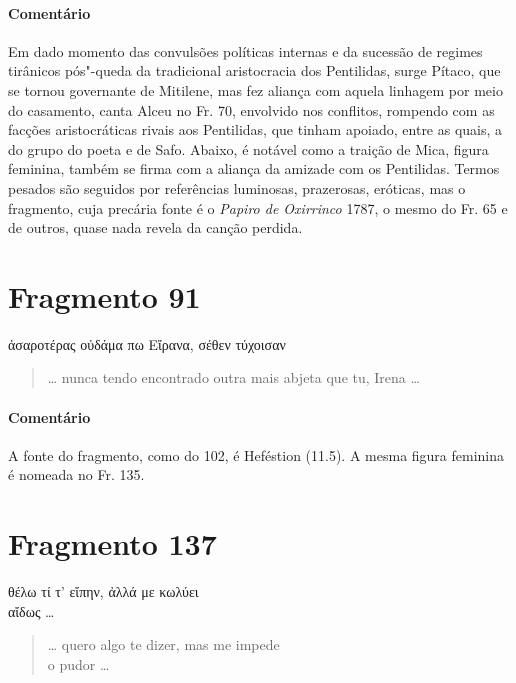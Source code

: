 {{\paragraph{Comentário} Em dado momento das convulsões políticas internas e da sucessão de regimes
tirânicos pós"-queda da tradicional aristocracia dos Pentilidas, surge Pítaco, que se tornou governante de
Mitilene, mas fez aliança com aquela linhagem por meio do casamento,
canta Alceu no Fr. 70, envolvido nos conflitos,
rompendo com as facções aristocráticas rivais aos Pentilidas, que tinham apoiado, entre as quais, a
do grupo do poeta e de Safo. Abaixo, é notável como a traição de 
Mica, figura feminina, também se firma com a aliança da amizade com os Pentilidas. Termos
pesados são seguidos por referências luminosas, prazerosas, eróticas, mas o
fragmento, cuja precária fonte é o \textit{Papiro de Oxirrinco} 1787, o mesmo do Fr. 65 e de outros, quase nada revela da canção perdida.}


\pagebreak
\section{Fragmento 91}

\begin{gkverse}
ἀσαροτέρας οὐδάμα πω Εἴρανα, σέθεν τύχοισαν
\end{gkverse}

\begin{verse}
\ldots{} nunca tendo encontrado outra mais abjeta que tu, Irena \ldots{}
\end{verse}

{\paragraph{Comentário} A fonte do fragmento, como do 102, é Heféstion (11.5).
A mesma figura feminina é nomeada no Fr. 135.}


\section{Fragmento 137}

\begin{gkverse}
θέλω τί τ’ εἴπην, ἀλλά με κωλύει\\
αἴδως \ldots{}
\end{gkverse}

\begin{verse}
\ldots{} quero algo te dizer, mas me impede\\
o pudor \ldots{}
\end{verse}

}
